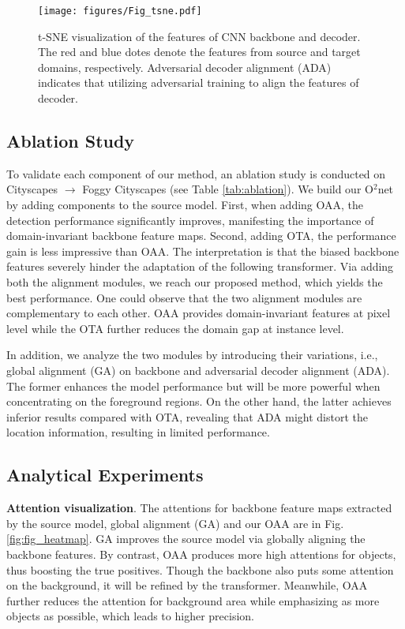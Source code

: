 \documentclass[sigconf]{acmart}
\begin{document}
\begin{figure}[t]
    \centerline{\texttt{[image: figures/Fig\_tsne.pdf]}}
    
    \caption{t-SNE \cite{tsne} visualization of the features of CNN backbone and decoder. The red and blue dotes denote the features from source and target domains, respectively. Adversarial decoder alignment (ADA) indicates that utilizing adversarial training to align the features of decoder.}
    \label{fig:fig_tsne}
    \vspace{-6mm}
\end{figure}

\subsection{Ablation Study} 
To validate each component of our method, an ablation study is conducted on Cityscapes $\rightarrow$ Foggy Cityscapes (see Table \ref{tab:ablation}). We build our O$^2$net by adding components to the source model. First, when adding OAA, the detection performance significantly improves, manifesting the importance of domain-invariant backbone feature maps. Second, adding OTA, the performance gain is less impressive than OAA. The interpretation is that the biased backbone features severely hinder the adaptation of the following transformer. Via adding both the alignment modules, we reach our proposed method, which yields the best performance. One could observe that the two alignment modules are complementary to each other. OAA provides domain-invariant features at pixel level while the OTA further reduces the domain gap at instance level.

In addition, we analyze the two modules by introducing their variations, i.e., global alignment (GA) on backbone and adversarial decoder alignment (ADA). The former enhances the model performance but will be more powerful when concentrating on the foreground regions. On the other hand, the latter achieves inferior results compared with OTA, revealing that ADA might distort the location information, resulting in limited performance.

\subsection{Analytical Experiments}

\textbf{Attention visualization}. 
The attentions for backbone feature maps extracted by the source model, global alignment (GA) and our OAA are in Fig. \ref{fig:fig_heatmap}. GA improves the source model via globally aligning the backbone features. By contrast, OAA produces more high attentions for objects, thus boosting the true positives. Though the backbone also puts some attention on the background, it will be refined by the transformer. Meanwhile, OAA further reduces the attention for background area while emphasizing as more objects as possible, which leads to higher precision.
\end{document}
